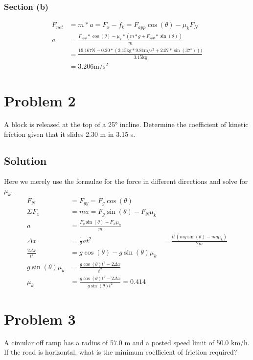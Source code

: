 \documentclass[12pt]{article}
\begin{document}
\subsubsection*{Section (b)}
\begin{align*}
    F_{net} &= m*a = F_{x} - f_k = F_{app}\cos(\theta) - \mu_k F_N\\
    a &= \frac{F_{app}*\cos(\theta) - \mu_k * (m*g + F_{app}*\sin(\theta))}{m}\\
        &= \frac{19.167 \unit{\newton} - 0.20 * (3.15\unit{\kilo\gram}*9.81\unit{\meter/\second^2} + 24\unit{\newton}*\sin(37\unit{\degree})))}{3.15\unit{\kilo\gram}}\\
        &= \boxed{3.206\unit{\meter/\second^2}}
\end{align*}

\pagebreak
\section*{Problem 2}
A block is released at the top of a 25\unit{\degree} incline. Determine the coefficient of kinetic friction given that it slides 2.30 m in 3.15 s.

\subsection*{Solution}
Here we merely use the formulae for the force in different directions and solve for $\mu_k$.
\begin{align*}
    F_N &= F_{gy} = F_g \cos(\theta)\\
    \Sigma F_x &= ma = F_g \sin(\theta) - F_N \mu_k\\
    a   &= \frac{F_g \sin(\theta) - F_N \mu_k}{m}\\
    \Delta x &= \frac{1}{2}at^2 &= \frac{t^2(mg \sin(\theta) - mg \mu_k)}{2m}\\
    \frac{2\Delta r}{t^2} &= g\cos(\theta) - g\sin(\theta)\mu_k\\
    g\sin(\theta)\mu_k &= \frac{g\cos(\theta)t^2 - 2\Delta x}{t^2}\\
    \mu_k &= \frac{g\cos(\theta)t^2 - 2\Delta x}{g\sin(\theta)t^2} = \boxed{0.414}
\end{align*}

\pagebreak
\section*{Problem 3}
A circular off ramp has a radius of 57.0 m and a posted speed limit of 50.0 km/h. If the road is horizontal, what is the minimum coefficient of friction required?
\end{document}

